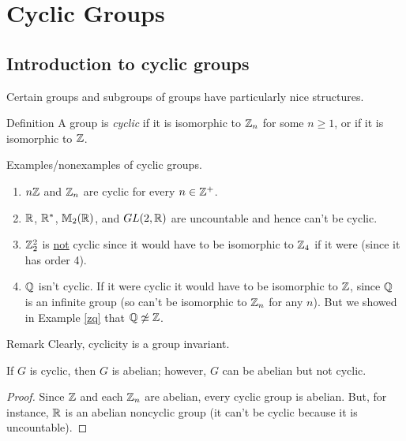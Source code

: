 \chapter{Cyclic Groups}\label{cyc}%

\section{Introduction to cyclic groups}
Certain groups and subgroups of groups have particularly nice structures.

\begin{df}{Definition} A group is \textit{cyclic} if it is isomorphic to $\mathbb{Z}_n$ for some $n\geq 1$, or if it is isomorphic to $\mathbb{Z}$.\end{df}


\begin{example}{} Examples/nonexamples of cyclic groups.
\begin{enumerate}
\item $n\mathbb{Z}$ and $\mathbb{Z}_n$ are cyclic for every $n\in \mathbb{Z}^+$.
\item $\mathbb{R}$, $\mathbb{R}^*$, $\mathbb{M}_2(\mathbb{R})$, and $GL(2,\mathbb{R})$ are uncountable and hence can't be cyclic.
\item $\mathbb{Z}_2^2$ is \underline{not} cyclic since it would have to be isomorphic to $\mathbb{Z}_4$ if it were (since it has order 4).

 \item $\mathbb{Q}$ isn't cyclic. If it were cyclic it would have to be isomorphic to $\mathbb{Z}$, since $\mathbb{Q}$
 is an infinite group (so can't be isomorphic to $\mathbb{Z}_n$ for any $n$). But we showed in Example \ref{zq} that $\mathbb{Q} \not\simeq \mathbb{Z}$.

\end{enumerate}
\end{example}


\begin{df}{Remark} Clearly, cyclicity is a group invariant.\end{df}

\begin{thm}\label{abcyc} If $G$ is cyclic, then $G$ is abelian; however, $G$
can be abelian but not cyclic.
\end{thm}

\begin{proof} Since $\mathbb{Z}$ and each $\mathbb{Z}_n$ are abelian, every cyclic group is abelian.  But, for instance, $\mathbb{R}$ is an abelian noncyclic group (it can't be cyclic because it is uncountable).\end{proof}

